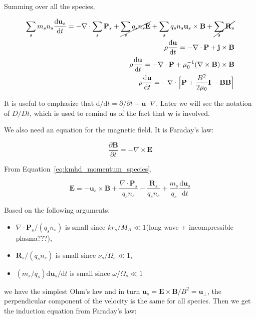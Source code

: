 \documentclass[
  notoc %
]{tufte-book}
\providecommand{\tightlist}{%
  \setlength{\itemsep}{0pt}\setlength{\parskip}{0pt}
}
\begin{document}
Summing over all the species,

\[
\begin{aligned}
\sum_s m_sn_s\frac{\mathrm{d}\mathbf{u}_s}{\mathrm{d}t} = -\nabla\cdot\sum_s\mathbf{P}_s + \cancel{\sum_s q_s n_s\mathbf{E}} + \sum_s q_s n_s\mathbf{u}_s\times\mathbf{B} + \cancel{\sum_s\mathbf{R}_s} \\
\rho\frac{\mathrm{d}\mathbf{u}}{\mathrm{d}t} = -\nabla\cdot\mathbf{P} + \mathbf{j}\times\mathbf{B} \\
\rho\frac{\mathrm{d}\mathbf{u}}{\mathrm{d}t} = -\nabla\cdot\mathbf{P} + \mu_0^{-1}(\nabla\times\mathbf{B})\times\mathbf{B} \\
\rho\frac{\mathrm{d}\mathbf{u}}{\mathrm{d}t} = -\nabla\cdot\Big[\mathbf{P} + \frac{B^2}{2\mu_0}\mathbf{I} - \mathbf{B}\mathbf{B}\Big]
\end{aligned}
\]

It is useful to emphasize that
\(\mathrm{d}/\mathrm{d}t = \partial/\partial t + \mathbf{u}\cdot\nabla\).
Later we will see the notation of \(D/Dt\), which is used to remind us
of the fact that \(\mathbf{w}\) is involved.

We also need an equation for the magnetic field. It is Faraday's law:

\[
\frac{\partial\mathbf{B}}{\partial t} = -\nabla\times\mathbf{E}
\]

From Equation~\ref{eq:kmhd_momentum_species},

\[
\mathbf{E} = -\mathbf{u}_s\times\mathbf{B} + \frac{\nabla\cdot\mathbf{P}_s}{q_sn_s} - \frac{\mathbf{R}_s}{q_sn_s} + \frac{m_s}{q_s}\frac{\mathrm{d}\mathbf{u}_s}{\mathrm{d}t}
\]

Based on the following arguments:

\begin{itemize}
\tightlist
\item
  \(\nabla\cdot\mathbf{P}_s/(q_sn_s)\) is small since
  \(kr_s/M_A \ll 1\)(long wave + incompressible plasma???),
\item
  \(\mathbf{R}_s/(q_sn_s)\) is small since \(\nu_s/\Omega_s\ll 1\),
\item
  \((m_s/q_s) \mathrm{d}\mathbf{u}_s/\mathrm{d}t\) is small since
  \(\omega/\Omega_s\ll 1\)
\end{itemize}

we have the simplest Ohm's law and in turn
\(\mathbf{u}_s = \mathbf{E}\times\mathbf{B}/B^2 = \mathbf{u}_\perp\),
the perpendicular component of the velocity is the same for all species.
Then we get the induction equation from Faraday's law:
\end{document}
